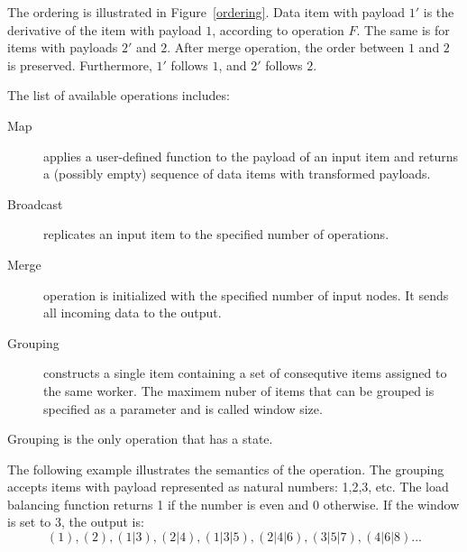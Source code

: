 The ordering is illustrated  in Figure~\ref{ordering}. Data item with payload $1'$ is the derivative of the item with payload $1$, according to operation $F$. The same is for items with payloads $2'$ and $2$. After merge operation, the order between $1$ and $2$ is preserved. Furthermore, $1'$ follows $1$, and $2'$ follows $2$.  



The list of available operations includes:
\begin {description}
\item [Map] applies a user-defined function to the payload of an input item and returns a (possibly empty) sequence of data items with transformed payloads. 

\item [Broadcast] replicates an input item to the specified number of operations.

\item [ Merge] operation is initialized with the specified number of input nodes. It sends all incoming data to the output.

\item [ Grouping]  constructs a single item containing a set of consequtive items assigned to the same worker. The maximem nuber of items that can be grouped is specified as a parameter and is called window size. 
\end {description}

Grouping is the only operation that has a state.


The following example illustrates the semantics of the operation. The grouping accepts items with payload represented as natural numbers: 1,2,3, etc. The load balancing function returns 1 if the number is even and 0 otherwise. If the window is set to 3, the output is: \[(1), (2), (1|3), (2|4), (1|3|5), (2|4|6), (3|5|7), (4|6|8)...\]

